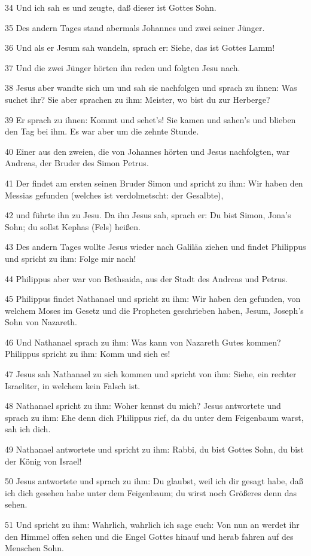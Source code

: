 \par 34 Und ich sah es und zeugte, daß dieser ist Gottes Sohn.
\par 35 Des andern Tages stand abermals Johannes und zwei seiner Jünger.
\par 36 Und als er Jesum sah wandeln, sprach er: Siehe, das ist Gottes Lamm!
\par 37 Und die zwei Jünger hörten ihn reden und folgten Jesu nach.
\par 38 Jesus aber wandte sich um und sah sie nachfolgen und sprach zu ihnen: Was suchet ihr? Sie aber sprachen zu ihm: Meister, wo bist du zur Herberge?
\par 39 Er sprach zu ihnen: Kommt und sehet's! Sie kamen und sahen's und blieben den Tag bei ihm. Es war aber um die zehnte Stunde.
\par 40 Einer aus den zweien, die von Johannes hörten und Jesus nachfolgten, war Andreas, der Bruder des Simon Petrus.
\par 41 Der findet am ersten seinen Bruder Simon und spricht zu ihm: Wir haben den Messias gefunden (welches ist verdolmetscht: der Gesalbte),
\par 42 und führte ihn zu Jesu. Da ihn Jesus sah, sprach er: Du bist Simon, Jona's Sohn; du sollst Kephas (Fels) heißen.
\par 43 Des andern Tages wollte Jesus wieder nach Galiläa ziehen und findet Philippus und spricht zu ihm: Folge mir nach!
\par 44 Philippus aber war von Bethsaida, aus der Stadt des Andreas und Petrus.
\par 45 Philippus findet Nathanael und spricht zu ihm: Wir haben den gefunden, von welchem Moses im Gesetz und die Propheten geschrieben haben, Jesum, Joseph's Sohn von Nazareth.
\par 46 Und Nathanael sprach zu ihm: Was kann von Nazareth Gutes kommen? Philippus spricht zu ihm: Komm und sieh es!
\par 47 Jesus sah Nathanael zu sich kommen und spricht von ihm: Siehe, ein rechter Israeliter, in welchem kein Falsch ist.
\par 48 Nathanael spricht zu ihm: Woher kennst du mich? Jesus antwortete und sprach zu ihm: Ehe denn dich Philippus rief, da du unter dem Feigenbaum warst, sah ich dich.
\par 49 Nathanael antwortete und spricht zu ihm: Rabbi, du bist Gottes Sohn, du bist der König von Israel!
\par 50 Jesus antwortete und sprach zu ihm: Du glaubst, weil ich dir gesagt habe, daß ich dich gesehen habe unter dem Feigenbaum; du wirst noch Größeres denn das sehen.
\par 51 Und spricht zu ihm: Wahrlich, wahrlich ich sage euch: Von nun an werdet ihr den Himmel offen sehen und die Engel Gottes hinauf und herab fahren auf des Menschen Sohn.


